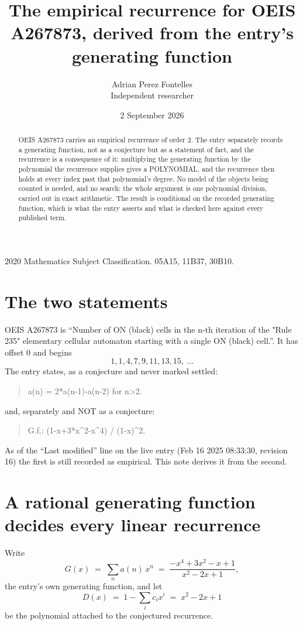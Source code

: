 \documentclass[11pt,a4paper]{article}
\title{The empirical recurrence for OEIS A267873, derived from the entry's generating function}
\author{Adrian Perez Fontelles\\ \small Independent researcher}
\date{2 September 2026}
\theoremstyle{plain}
\theoremstyle{definition}
\begin{document}
\maketitle

\begin{abstract}
OEIS A267873 carries an empirical recurrence of order $2$. The entry separately records a
generating function, not as a conjecture but as a statement of fact, and the recurrence is a
consequence of it: multiplying the generating function by the polynomial the recurrence
supplies gives a POLYNOMIAL, and the recurrence then holds at every index past that
polynomial's degree. No model of the objects being counted is needed, and no search: the
whole argument is one polynomial division, carried out in exact arithmetic. The result is
conditional on the recorded generating function, which is what the entry asserts and what is
checked here against every published term.
\end{abstract}

\noindent\small 2020 Mathematics Subject Classification. 05A15, 11B37, 30B10.\normalsize

\section{The two statements}

OEIS A267873 is ``Number of ON (black) cells in the n-th iteration of the "Rule 235" elementary cellular automaton starting with a single ON (black) cell.''. It has offset $0$ and begins
\[
1, 1, 4, 7, 9, 11, 13, 15,\ \dots
\]
The entry states, as a conjecture and never marked settled:
\begin{quote}
a(n) = 2*a(n-1)-a(n-2) for n>2.
\end{quote}
and, separately and NOT as a conjecture:
\begin{quote}
G.f.: (1-x+3*x\^{}2-x\^{}4) / (1-x)\^{}2.
\end{quote}
As of the ``Last modified'' line on the live entry (Feb 16 2025 08:33:30, revision 16) the first is still
recorded as empirical. This note derives it from the second.

\section{A rational generating function decides every linear recurrence}

Write
\[
G(x)\;=\;\sum_{n}a(n)\,x^{n}\;=\;\frac{- x^{4} + 3 x^{2} - x + 1}{x^{2} - 2 x + 1},
\]
the entry's own generating function, and let
\[
D(x)\;=\;1-\sum_i c_i x^{i}\;=\;x^{2} - 2 x + 1
\]
be the polynomial attached to the conjectured recurrence.
\end{document}
